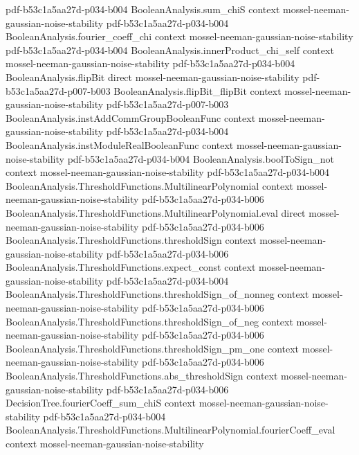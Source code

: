 \begin{theorem}
  {pdf-b53c1a5aa27d-p034-b004}
\proofstep
  {BooleanAnalysis.sum_chiS}
  {context}
  {mossel-neeman-gaussian-noise-stability}
  {pdf-b53c1a5aa27d-p034-b004}
\proofstep
  {BooleanAnalysis.fourier_coeff_chi}
  {context}
  {mossel-neeman-gaussian-noise-stability}
  {pdf-b53c1a5aa27d-p034-b004}
\proofstep
  {BooleanAnalysis.innerProduct_chi_self}
  {context}
  {mossel-neeman-gaussian-noise-stability}
  {pdf-b53c1a5aa27d-p034-b004}
\proofstep
  {BooleanAnalysis.flipBit}
  {direct}
  {mossel-neeman-gaussian-noise-stability}
  {pdf-b53c1a5aa27d-p007-b003}
\proofstep
  {BooleanAnalysis.flipBit_flipBit}
  {context}
  {mossel-neeman-gaussian-noise-stability}
  {pdf-b53c1a5aa27d-p007-b003}
\proofstep
  {BooleanAnalysis.instAddCommGroupBooleanFunc}
  {context}
  {mossel-neeman-gaussian-noise-stability}
  {pdf-b53c1a5aa27d-p034-b004}
\proofstep
  {BooleanAnalysis.instModuleRealBooleanFunc}
  {context}
  {mossel-neeman-gaussian-noise-stability}
  {pdf-b53c1a5aa27d-p034-b004}
\proofstep
  {BooleanAnalysis.boolToSign_not}
  {context}
  {mossel-neeman-gaussian-noise-stability}
  {pdf-b53c1a5aa27d-p034-b004}
\proofstep
  {BooleanAnalysis.ThresholdFunctions.MultilinearPolynomial}
  {context}
  {mossel-neeman-gaussian-noise-stability}
  {pdf-b53c1a5aa27d-p034-b006}
\proofstep
  {BooleanAnalysis.ThresholdFunctions.MultilinearPolynomial.eval}
  {direct}
  {mossel-neeman-gaussian-noise-stability}
  {pdf-b53c1a5aa27d-p034-b006}
\proofstep
  {BooleanAnalysis.ThresholdFunctions.thresholdSign}
  {context}
  {mossel-neeman-gaussian-noise-stability}
  {pdf-b53c1a5aa27d-p034-b006}
\proofstep
  {BooleanAnalysis.ThresholdFunctions.expect_const}
  {context}
  {mossel-neeman-gaussian-noise-stability}
  {pdf-b53c1a5aa27d-p034-b004}
\proofstep
  {BooleanAnalysis.ThresholdFunctions.thresholdSign_of_nonneg}
  {context}
  {mossel-neeman-gaussian-noise-stability}
  {pdf-b53c1a5aa27d-p034-b006}
\proofstep
  {BooleanAnalysis.ThresholdFunctions.thresholdSign_of_neg}
  {context}
  {mossel-neeman-gaussian-noise-stability}
  {pdf-b53c1a5aa27d-p034-b006}
\proofstep
  {BooleanAnalysis.ThresholdFunctions.thresholdSign_pm_one}
  {context}
  {mossel-neeman-gaussian-noise-stability}
  {pdf-b53c1a5aa27d-p034-b006}
\proofstep
  {BooleanAnalysis.ThresholdFunctions.abs_thresholdSign}
  {context}
  {mossel-neeman-gaussian-noise-stability}
  {pdf-b53c1a5aa27d-p034-b006}
\proofstep
  {DecisionTree.fourierCoeff_sum_chiS}
  {context}
  {mossel-neeman-gaussian-noise-stability}
  {pdf-b53c1a5aa27d-p034-b004}
\proofstep
  {BooleanAnalysis.ThresholdFunctions.MultilinearPolynomial.fourierCoeff_eval}
  {context}
  {mossel-neeman-gaussian-noise-stability}

\end{theorem}
